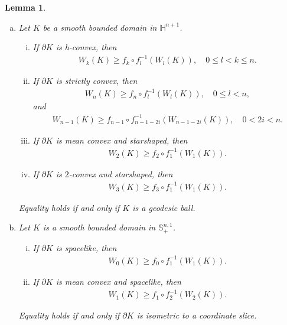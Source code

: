 \documentclass[11pt,reqno]{amsart}
\newtheorem{lem}[thm]{Lemma}
\theoremstyle{definition}
\theoremstyle{remark}
\numberwithin{equation}{section}
\renewcommand{\(}{\left(}
\renewcommand{\)}{\right)}
\renewcommand{\~}{\tilde}
\renewcommand{\-}{\overline}
\begin{document}
\begin{lem}\label{s5:key-lemma-ineq-II}
\begin{enumerate}[(a)]
\item Let $K$ be a smooth bounded domain in $\mathbb H^{n+1}$. 
\begin{enumerate}[(i)]
\item \cite{Wang-Xia14,Hu-Li-Wei2020} If $\partial K$ is h-convex, then 
\begin{align}\label{quermassintegral-ineq-hyperbolic}
W_k(K) \geq f_k \circ f_l^{-1}(W_l(K)), \quad 0\leq l<k\leq n.
\end{align}
\item \cite{AHL2020,BGL19} If $\partial K$ is strictly convex, then 
\begin{align}\label{quermassintegral-ineq-hyperbolic-strictly-convex}
W_n(K) \geq f_n \circ f_l^{-1}(W_l(K)), \quad 0\leq l<n,
\end{align}
and
\begin{align}\label{quermassintegral-ineq-hyperbolic-strictly-convex-III}
W_{n-1}(K) \geq f_{n-1}\circ f_{n-1-2i}^{-1}(W_{n-1-2i}(K)), \quad 0<2i<n.
\end{align}
\item \cite{BGL19,GL21} If $\partial K$ is mean convex and starshaped, then 
\begin{align}\label{quermassintegral-ineq-hyperbolic-1-convex}
W_2(K) \geq f_2 \circ f_1^{-1}(W_1(K)).
\end{align}
\item \cite{LWX14} If $\partial K$ is $2$-convex and starshaped, then 
\begin{align}\label{quermassintegral-ineq-hyperbolic-2-convex}
W_3(K) \geq f_3 \circ f_1^{-1}(W_1(K)).
\end{align}
\end{enumerate}
Equality holds if and only if $K$ is a geodesic ball.

\item Let $K$ is a smooth bounded domain in $\mathbb S^{n,1}_{+}$.
\begin{enumerate}[(i)]
	\item \cite{Lambert-Scheuer2021} If $\partial K$ is spacelike, then 
	\begin{align}\label{quermassintegral-ineq-deSitter-I}
	W_0(K) \geq f_0\circ f_1^{-1}(W_1(K)).
	\end{align}
	\item \cite{Scheuer19} If $\partial K$ is mean convex and spacelike, then
\begin{align}\label{quermassintegral-ineq-deSitter-II}
W_1(K) \geq f_1\circ f_2^{-1}(W_2(K)).
\end{align}
\end{enumerate}
Equality holds if and only if $\partial K$ is isometric to a coordinate slice.
\end{enumerate}
\end{lem}
\end{document}
